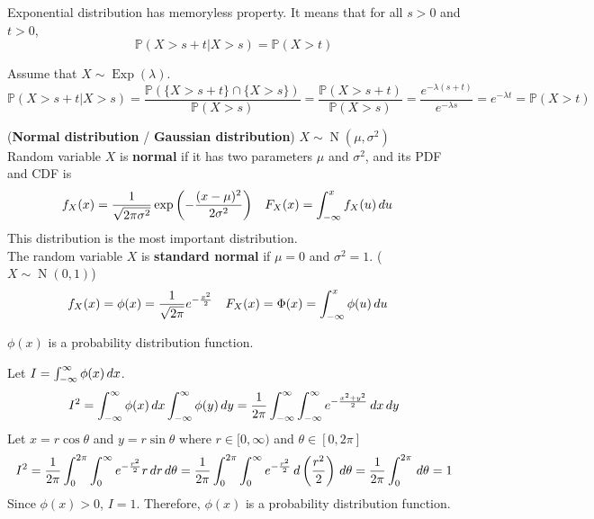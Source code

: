 \documentclass{huhtakm-template-book}
\newcommand{\prob}{\mathbb{P}}
\DeclareMathOperator{\Exp}{Exp}
\DeclareMathOperator{\N}{N}
\begin{document}
\begin{thm}
	Exponential distribution has memoryless property. It means that for all $s>0$ and $t>0$,
	\begin{equation*}
		\prob(X>s+t|X>s)=\prob(X>t)
	\end{equation*}
\end{thm}
\begin{proofing}
	Assume that $X\sim\Exp(\lambda)$.
	\begin{equation*}
		\prob(X>s+t|X>s)=\frac{\prob(\{X>s+t\}\cap\{X>s\})}{\prob(X>s)}=\frac{\prob(X>s+t)}{\prob(X>s)}=\frac{e^{-\lambda(s+t)}}{e^{-\lambda s}}=e^{-\lambda t}=\prob(X>t)
	\end{equation*}
\end{proofing}
\begin{eg}(\textbf{Normal distribution} / \textbf{Gaussian distribution}) $X\sim\N(\mu,\sigma^{2})$\\
	Random variable $X$ is \textbf{normal} if it has two parameters $\mu$ and $\sigma^{2}$, and its PDF and CDF is
	\begin{align*}
		f_{X}(x)&=\frac{1}{\sqrt{2\pi\sigma^{2}}}\exp\left(-\frac{(x-\mu)^{2}}{2\sigma^{2}}\right) & F_{X}(x)&=\int_{-\infty}^{x}f_{X}(u)\,du
	\end{align*}
	This distribution is the most important distribution.\\
	The random variable $X$ is \textbf{standard normal} if $\mu=0$ and $\sigma^{2}=1$. ($X\sim\N(0,1)$)
	\begin{align*}
		f_{X}(x)&=\phi(x)=\frac{1}{\sqrt{2\pi}}e^{-\frac{x^{2}}{2}} & F_{X}(x)&=\Phi(x)=\int_{-\infty}^{x}\phi(u)\,du
	\end{align*}
\end{eg}
\begin{cla}
	$\phi(x)$ is a probability distribution function.
\end{cla}
\begin{proofing}
	Let $I=\int_{-\infty}^{\infty}\phi(x)\,dx$.
	\begin{equation*}
		I^{2}=\int_{-\infty}^{\infty}\phi(x)\,dx\int_{-\infty}^{\infty}\phi(y)\,dy=\frac{1}{2\pi}\int_{-\infty}^{\infty}\int_{-\infty}^{\infty} e^{-\frac{x^{2}+y^{2}}{2}}\,dx\,dy
	\end{equation*}
	Let $x=r\cos\theta$ and $y=r\sin\theta$ where $r\in[0,\infty)$ and $\theta\in[0,2\pi]$
	\begin{equation*}
		I^{2}=\frac{1}{2\pi}\int_{0}^{2\pi}\int_{0}^{\infty}e^{-\frac{r^{2}}{2}}r\,dr\,d\theta=\frac{1}{2\pi}\int_{0}^{2\pi}\int_{0}^{\infty}e^{-\frac{r^{2}}{2}}\,d\left(\frac{r^{2}}{2}\right)\,d\theta=\frac{1}{2\pi}\int_{0}^{2\pi}\,d\theta=1
	\end{equation*}
	Since $\phi(x)>0$, $I=1$. Therefore, $\phi(x)$ is a probability distribution function.
\end{proofing}
\end{document}
